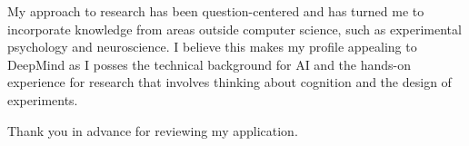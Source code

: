 My approach to research has been question-centered and has turned me to
incorporate knowledge from areas outside computer science, such as experimental
psychology and neuroscience. I believe this makes my profile appealing to
DeepMind as I posses the technical background for AI and the hands-on
experience for research that involves thinking about cognition and the design
of experiments.

\vspace{0.4cm}
Thank you in advance for reviewing my application.
\vspace{0.2cm}

%
%
%
